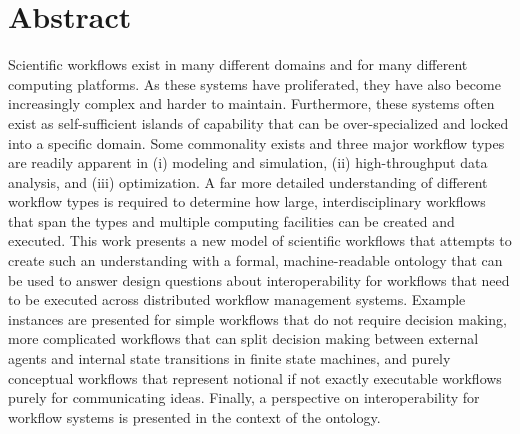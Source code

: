 \chapter*{Abstract}\label{ch:abstract}

Scientific workflows exist in many different domains and for many different
computing platforms. As these systems have proliferated, they have also become
increasingly complex and harder to maintain. Furthermore, these systems often
exist as self-sufficient islands of capability that can be over-specialized and
locked into a specific domain. Some commonality exists and three major workflow
types are readily apparent in (i) modeling and simulation, (ii) high-throughput
data analysis, and (iii) optimization. A far more detailed understanding of
different workflow types is required to determine how large, interdisciplinary
workflows that span the types and multiple computing facilities can be created
and executed. This work presents a new model of scientific workflows that
attempts to create such an understanding with a formal, machine-readable
ontology that can be used to answer design questions about interoperability for
workflows that need to be executed across distributed workflow management
systems. Example instances are presented for simple workflows that do not
require decision making, more complicated workflows that can split decision
making between external agents and internal state transitions in finite state
machines, and purely conceptual workflows that represent notional if not exactly
executable workflows purely for communicating ideas. Finally, a perspective on
interoperability for workflow systems is presented in the context of the
ontology.